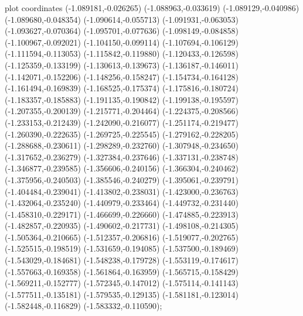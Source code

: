 { plot coordinates {(-1.089181,-0.026265) (-1.088963,-0.033619) (-1.089129,-0.040986) (-1.089680,-0.048354) (-1.090614,-0.055713) (-1.091931,-0.063053) (-1.093627,-0.070364) (-1.095701,-0.077636) (-1.098149,-0.084858) (-1.100967,-0.092021) (-1.104150,-0.099114) (-1.107694,-0.106129) (-1.111594,-0.113053) (-1.115842,-0.119880) (-1.120433,-0.126598) (-1.125359,-0.133199) (-1.130613,-0.139673) (-1.136187,-0.146011) (-1.142071,-0.152206) (-1.148256,-0.158247) (-1.154734,-0.164128) (-1.161494,-0.169839) (-1.168525,-0.175374) (-1.175816,-0.180724) (-1.183357,-0.185883) (-1.191135,-0.190842) (-1.199138,-0.195597) (-1.207355,-0.200139) (-1.215771,-0.204464) (-1.224375,-0.208566) (-1.233153,-0.212439) (-1.242090,-0.216077) (-1.251174,-0.219477) (-1.260390,-0.222635) (-1.269725,-0.225545) (-1.279162,-0.228205) (-1.288688,-0.230611) (-1.298289,-0.232760) (-1.307948,-0.234650) (-1.317652,-0.236279) (-1.327384,-0.237646) (-1.337131,-0.238748) (-1.346877,-0.239585) (-1.356606,-0.240156) (-1.366304,-0.240462) (-1.375956,-0.240503) (-1.385546,-0.240279) (-1.395061,-0.239791) (-1.404484,-0.239041) (-1.413802,-0.238031) (-1.423000,-0.236763) (-1.432064,-0.235240) (-1.440979,-0.233464) (-1.449732,-0.231440) (-1.458310,-0.229171) (-1.466699,-0.226660) (-1.474885,-0.223913) (-1.482857,-0.220935) (-1.490602,-0.217731) (-1.498108,-0.214305) (-1.505364,-0.210665) (-1.512357,-0.206816) (-1.519077,-0.202765) (-1.525515,-0.198519) (-1.531659,-0.194085) (-1.537500,-0.189469) (-1.543029,-0.184681) (-1.548238,-0.179728) (-1.553119,-0.174617) (-1.557663,-0.169358) (-1.561864,-0.163959) (-1.565715,-0.158429) (-1.569211,-0.152777) (-1.572345,-0.147012) (-1.575114,-0.141143) (-1.577511,-0.135181) (-1.579535,-0.129135) (-1.581181,-0.123014) (-1.582448,-0.116829) (-1.583332,-0.110590)};
}
